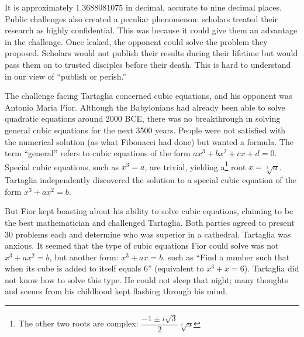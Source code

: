 \documentclass[b5paper]{article}
\begin{document}
It is approximately $1.3688081075$ in decimal, accurate to nine decimal places. Public challenges also created a peculiar phenomenon: scholars treated their research as highly confidential. This was because it could give them an advantage in the challenge. Once leaked, the opponent could solve the problem they proposed. Scholars would not publish their results during their lifetime but would pass them on to trusted disciples before their death. This is hard to understand in our view of \enquote{publish or perish.}\cite{HanXueTao2012}

The challenge facing Tartaglia concerned cubic equations, and his opponent was Antonio Maria Fior. Although the Babylonians had already been able to solve quadratic equations around 2000 BCE, there was no breakthrough in solving general cubic equations for the next 3500 years. People were not satisfied with the numerical solution (as what Fibonacci had done) but wanted a formula. The term \enquote{general} refers to cubic equations of the form $ax^3 + bx^2 + cx + d = 0$. Special cubic equations, such as $x^3 = a$, are trivial, yielding a\footnote{The other two roots are complex: $\dfrac{-1 \pm i\sqrt{3}}{2}\sqrt[3]{a}$} root $x = \sqrt[3]{a}$. Tartaglia independently discovered the solution to a special cubic equation of the form $x^3 + ax^2 = b$.

But Fior kept boasting about his ability to solve cubic equations, claiming to be the best mathematician and challenged Tartaglia. Both parties agreed to present 30 problems each and determine who was superior in a cathedral. Tartaglia was anxious. It seemed that the type of cubic equations Fior could solve was not $x^3 + ax^2 = b$, but another form: $x^3 + ax = b$, such as \enquote{Find a number such that when its cube is added to itself equals 6} (equivalent to $x^3 + x = 6$). Tartaglia did not know how to solve this type\cite{MacTour-Tartaglia-Cardan}. He could not sleep that night; many thoughts and scenes from his childhood kept flashing through his mind.
\end{document}
